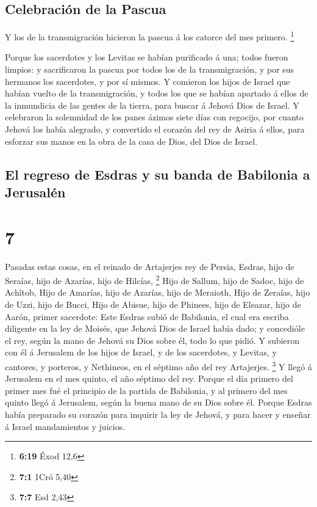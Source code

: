 \hypertarget{celebraciuxf3n-de-la-pascua}{%
\subsection{Celebración de la
Pascua}\label{celebraciuxf3n-de-la-pascua}}

 Y los de la transmigración hicieron la pascua á los
catorce del mes primero. \footnote{\textbf{6:19} Éxod 12,6}

 Porque los sacerdotes y los Levitas se habían purificado á
una; todos fueron limpios: y sacrificaron la pascua por todos los de la
transmigración, y por sus hermanos los sacerdotes, y por sí mismos.
 Y comieron los hijos de Israel que habían vuelto de la
transmigración, y todos los que se habían apartado á ellos de la
inmundicia de las gentes de la tierra, para buscar á Jehová Dios de
Israel.  Y celebraron la solemnidad de los panes ázimos
siete días con regocijo, por cuanto Jehová los había alegrado, y
convertido el corazón del rey de Asiria á ellos, para esforzar sus manos
en la obra de la casa de Dios, del Dios de Israel.

\hypertarget{el-regreso-de-esdras-y-su-banda-de-babilonia-a-jerusaluxe9n}{%
\subsection{El regreso de Esdras y su banda de Babilonia a
Jerusalén}\label{el-regreso-de-esdras-y-su-banda-de-babilonia-a-jerusaluxe9n}}

\hypertarget{section-6}{%
\section{7}\label{section-6}}

 Pasadas estas cosas, en el reinado de Artajerjes rey de
Persia, Esdras, hijo de Seraías, hijo de Azarías, hijo de Hilcías,
\footnote{\textbf{7:1} 1Cró 5,40}  Hijo de Sallum, hijo de
Sadoc, hijo de Achîtob,  Hijo de Amarías, hijo de Azarías,
hijo de Meraioth,  Hijo de Zeraías, hijo de Uzzi, hijo de
Bucci,  Hijo de Abisue, hijo de Phinees, hijo de Eleazar,
hijo de Aarón, primer sacerdote:  Este Esdras subió de
Babilonia, el cual era escriba diligente en la ley de Moisés, que Jehová
Dios de Israel había dado; y concedióle el rey, según la mano de Jehová
su Dios sobre él, todo lo que pidió.  Y subieron con él á
Jerusalem de los hijos de Israel, y de los sacerdotes, y Levitas, y
cantores, y porteros, y Nethineos, en el séptimo año del rey Artajerjes.
\footnote{\textbf{7:7} Esd 2,43}  Y llegó á Jerusalem en el
mes quinto, el año séptimo del rey.  Porque el día primero
del primer mes fué el principio de la partida de Babilonia, y al primero
del mes quinto llegó á Jerusalem, según la buena mano de su Dios sobre
él.  Porque Esdras había preparado su corazón para inquirir
la ley de Jehová, y para hacer y enseñar á Israel mandamientos y
juicios.

